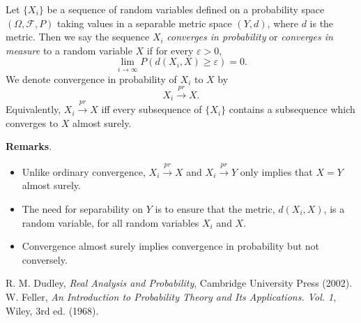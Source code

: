 \documentclass[12pt]{article}
\begin{document}
Let $\lbrace X_i \rbrace$ be a sequence of random variables defined on a probability space $(\Omega,\mathcal{F},P)$ taking values in a separable metric
space $(Y,d)$, where $d$ is the metric.  Then we say the sequence
$X_i$ \emph{converges in probability} or \emph{converges in measure} to a random variable $X$ if
for every $\varepsilon>0$,
$$\lim_{i\rightarrow\infty}P(d(X_i,X)\geq\varepsilon)=0.$$
We denote convergence in probability of $X_i$ to $X$ by
$$X_i\stackrel{pr}{\longrightarrow} X.$$
Equivalently, $X_i\stackrel{pr}{\longrightarrow} X$ iff every subsequence of $\lbrace X_i\rbrace$ contains a subsequence which converges to $X$ almost surely.

\textbf{Remarks}.  
\begin{itemize}
\item Unlike ordinary convergence, $X_i\stackrel{pr}{\longrightarrow} X$ and $X_i\stackrel{pr}{\longrightarrow} Y$ only implies that $X=Y$ almost surely.
\item The need for separability on $Y$ is to ensure that the metric, $d(X_i,X)$, is a random variable, for all random variables $X_i$ and $X$.
\item Convergence almost surely implies convergence in probability but not conversely.
\end{itemize}

\begin{thebibliography}{8}
 R. M. Dudley, {\em Real Analysis and Probability}, Cambridge University Press (2002).
 W. Feller, {\em An Introduction to Probability Theory and Its Applications. Vol. 1}, Wiley, 3rd ed. (1968).
\end{thebibliography}
\end{document}
